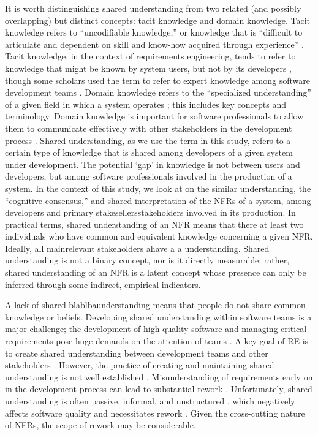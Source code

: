 \documentclass[smallextended]{svjour3}
\begin{document}
It is worth distinguishing shared understanding from two related (and possibly overlapping) but distinct concepts: tacit knowledge and domain knowledge. Tacit knowledge refers to ``uncodifiable knowledge,'' or knowledge that is ``difficult to articulate and dependent on skill and know-how
acquired through experience'' \citep{gacitua2009making}. 
Tacit knowledge, in the context of requirements engineering, tends to refer to knowledge that might be known by system users, but not by its developers \citep{sporsem2023refsq,niknafs2017impact}, though some scholars used the term to refer to expert knowledge among software development teams \citep{ryan2009development,ryan2013acquiring}.
Domain knowledge refers to the ``specialized understanding'' of a given field in which a system operates \citep{araujo2025domain}; this includes key concepts and terminology. Domain knowledge is important for software professionals to allow them to communicate effectively with other stakeholders in the development process \citep{ryan2013acquiring}.
Shared understanding, as we use the term in this study, refers to a certain type of knowledge that is shared among developers of a given system under development. The potential `gap' in knowledge is not between users and developers, but among software professionals involved in the production of a system. 
In the context of this study, we look at on the similar understanding, the ``cognitive consensus,'' and shared interpretation of the NFRs of a system, among developers and primary stakesellersstakeholders involved in its production. 
In practical terms, shared understanding of an NFR means that there at least two individuals who have common and equivalent knowledge concerning a given NFR. Ideally, all mainrelevant stakeholders ahave a a understanding. Shared understanding is not a binary concept, nor is it directly measurable; rather, shared understanding of an NFR is a latent concept whose presence can only be inferred through some indirect, empirical indicators.



A lack of shared blablbaunderstanding means that people do not share common knowledge or beliefs. 
Developing shared understanding within software teams is a major challenge; the development of high-quality software and managing critical requirements pose huge demands on the attention of teams \citep{hoffmann2013emergence,corvera2013emergence}.
A key goal of RE is to create shared understanding between development teams and other stakeholders \citep{fricker2015requirements}. However,  the practice of creating and maintaining shared understanding is not well established \citep{schon_agile_2017}.
Misunderstanding of requirements early on in the development process can lead to substantial rework \citep{bjarnason2011case}.
Unfortunately, shared understanding is often passive, informal, and unstructured \citep{glinz_shared_2015}, which negatively affects software quality and necessitates rework \citep{damiantse2006}. Given the cross-cutting nature of NFRs, the scope of rework may be considerable.
\end{document}
